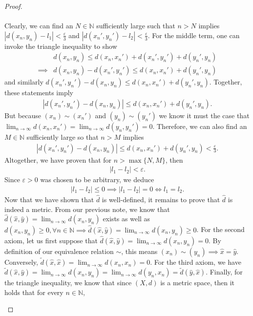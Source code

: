 \documentclass[11pt]{article}
\theoremstyle{mystyle}
\newcommand{\0}{\mathbf{0}}
\begin{document}
\begin{proof}
\begin{enumerate}[(a)]
\begin{align*}
\end{align*}
Clearly, we can find an $N \in \mathbb{N}$ sufficiently large such that $n > N$ implies $|d(x_n, y_n) - l_1| < \frac{\varepsilon}{3}$ and $|d(x_n', y_n') - l_2| < \frac{\varepsilon}{3}$. For the middle term, one can invoke the triangle inequality to show
\begin{align*}
    &d(x_n, y_n) \leq d(x_n, x_n') + d(x_n', y_n') + d(y_n', y_n)\\
    \implies&d(x_n, y_n) - d(x_n', y_n') \leq d(x_n, x_n') + d(y_n', y_n)
\end{align*}
and similarly $d(x_n', y_n') - d(x_n, y_n) \leq d(x_n, x_n') + d(y_n', y_n)$. Together, these statements imply \begin{align*}
    |d(x_n', y_n') - d(x_n, y_n)| \leq d(x_n, x_n') + d(y_n', y_n).
\end{align*}
But because $(x_n) \sim (x_n')$ and $(y_n) \sim (y_n')$ we know it must the case that $\lim_{n \to \infty} d(x_n, x_n') = \lim_{n \to \infty} d(y_n, y_n') = 0$. Therefore, we can also find an $M \in \mathbb{N}$ sufficiently large so that $n > M$ implies
\begin{align*}
    |d(x_n', y_n') - d(x_n, y_n)| \leq d(x_n, x_n') + d(y_n', y_n) < \frac{\varepsilon}{3}.
\end{align*}
Altogether, we have proven that for $n > \max\{N, M\}$, then
\begin{align*}
    |l_1 - l_2| < \varepsilon.
\end{align*}
Since $\varepsilon > 0$ was chosen to be arbitrary, we deduce
\begin{align*}
    |l_1 - l_2| \leq 0 \implies |l_1 - l_2| = 0 \iff l_1 = l_2.
\end{align*}\newline
Now that we have shown that $\hat{d}$ is well-defined, it remains to prove that $\hat{d}$ is indeed a metric. From our previous note, we know that $\hat{d}(\hat{x}, \hat{y}) = \lim_{n \to \infty} d(x_n, y_n)$ exists as well as $d(x_n, y_n) \geq 0, \forall n \in \mathbb{N} \implies \hat{d}(\hat{x}, \hat{y}) = \lim_{n \to \infty} d(x_n, y_n) \geq 0$. For the second axiom, let us first suppose that $\hat{d}(\hat{x}, \hat{y}) = \lim_{n \to \infty} d(x_n, y_n) = 0$. By definition of our equivalence relation $\sim$, this means $(x_n) \sim (y_n) \implies \hat{x} = \hat{y}$. Conversely, $\tilde{d}(\hat{x}, \hat{x}) = \lim_{n\to \infty} d(x_n, x_n) = 0$. For the third axiom, we have $\tilde{d}(\hat{x}, \hat{y}) = \lim_{n \to \infty} d(x_n, y_n) = \lim_{n \to \infty} d(y_n, x_n) = \tilde{d}(\hat{y}, \hat{x})$. Finally, for the triangle inequality, we know that since $(X, d)$ is a metric space, then it holds that for every $n \in \mathbb{N}$,

\end{enumerate}
\end{proof}
\end{document}
